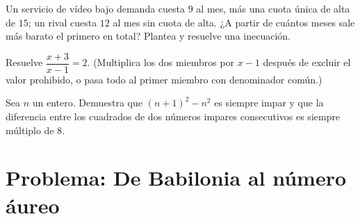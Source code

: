 \begin{exercise}[$\star\star$]\label{exo:g10:algebra:9}
Un servicio de vídeo bajo demanda cuesta $9$ al mes, más una cuota única
de alta de $15$; un rival cuesta $12$ al mes sin cuota de alta. ¿A partir
de cuántos meses sale más barato el primero en total? Plantea y resuelve
una inecuación.
\end{exercise}

\begin{exercise}[$\star\star$]\label{exo:g10:algebra:10}
Resuelve $\dfrac{x+3}{x-1} = 2$. (Multiplica los dos miembros por $x - 1$
después de excluir el valor prohibido, o pasa todo al primer miembro con
denominador común.)
\end{exercise}

\begin{exercise}[$\star\star\star$]\label{exo:g10:algebra:11}
Sea $n$ un entero. Demuestra que $(n + 1)^2 - n^2$ es siempre impar y que
la diferencia entre los cuadrados de dos números impares consecutivos es
siempre múltiplo de $8$.
\end{exercise}

\section{Problema: De Babilonia al número áureo}

